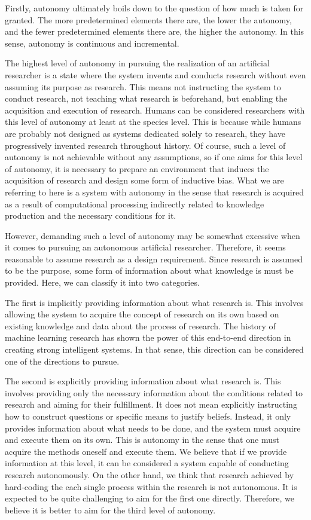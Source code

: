 Firstly, autonomy ultimately boils down to the question of how much is taken for granted. The more predetermined elements there are, the lower the autonomy, and the fewer predetermined elements there are, the higher the autonomy. In this sense, autonomy is continuous and incremental.

The highest level of autonomy in pursuing the realization of an artificial researcher is a state where the system invents and conducts research without even assuming its purpose as research. This means not instructing the system to conduct research, not teaching what research is beforehand, but enabling the acquisition and execution of research. Humans can be considered researchers with this level of autonomy at least at the species level. This is because while humans are probably not designed as systems dedicated solely to research, they have progressively invented research throughout history. Of course, such a level of autonomy is not achievable without any assumptions, so if one aims for this level of autonomy, it is necessary to prepare an environment that induces the acquisition of research and design some form of inductive bias. What we are referring to here is a system with autonomy in the sense that research is acquired as a result of computational processing indirectly related to knowledge production and the necessary conditions for it.

However, demanding such a level of autonomy may be somewhat excessive when it comes to pursuing an autonomous artificial researcher. Therefore, it seems reasonable to assume research as a design requirement. Since research is assumed to be the purpose, some form of information about what knowledge is must be provided. Here, we can classify it into two categories.

The first is implicitly providing information about what research is. This involves allowing the system to acquire the concept of research on its own based on existing knowledge and data about the process of research. The history of machine learning research has shown the power of this end-to-end direction in creating strong intelligent systems. In that sense, this direction can be considered one of the directions to pursue.

The second is explicitly providing information about what research is. This involves providing only the necessary information about the conditions related to research and aiming for their fulfillment. It does not mean explicitly instructing how to construct questions or specific means to justify beliefs. Instead, it only provides information about what needs to be done, and the system must acquire and execute them on its own. This is autonomy in the sense that one must acquire the methods oneself and execute them. We believe that if we provide information at this level, it can be considered a system capable of conducting research autonomously. On the other hand, we think that research achieved by hard-coding the each single process within the research is not autonomous. It is expected to be quite challenging to aim for the first one   directly. Therefore, we believe it is better to aim for the third level of autonomy. 

